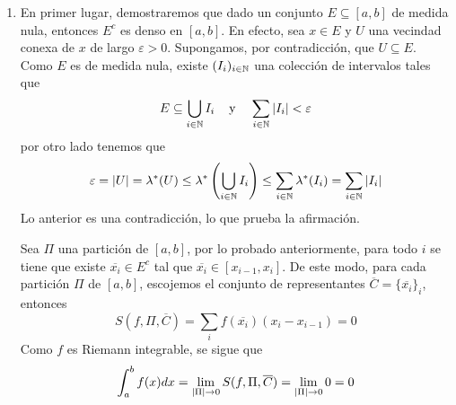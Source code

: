 \documentclass{article}
\begin{document}
\begin{enumerate}
    \item En primer lugar, demostraremos que dado un conjunto $E\subseteq[a,b]$ de medida nula, 
    entonces $E^{c}$ es denso en $[a,b]$. En efecto, sea $x\in E$ y $U$ una vecindad conexa de $x$ 
    de largo $\varepsilon>0$. Supongamos, por contradicción, que $U\subseteq E$. 
    Como $E$ es de medida nula, existe $(I_{i})_{i\in\mathbb{N}}$ una colección de intervalos tales que
    \begin{equation*}
        E\subseteq\bigcup_{i\in\mathbb{N}}I_{i}\hspace{4mm}\text{y}\hspace{4mm}
        \sum_{i\in\mathbb{N}}\left|I_{i} \right|<\varepsilon
    \end{equation*}
    por otro lado tenemos que
    \begin{equation*}
        \varepsilon=\left|U \right|=\lambda^{*}(U)\leq\lambda^{*}\left(\bigcup_{i\in\mathbb{N}}I_{i}\right)\leq
        \sum_{i\in\mathbb{N}}\lambda^{*}(I_{i})=\sum_{i\in\mathbb{N}}\left|I_{i} \right|
    \end{equation*}
    Lo anterior es una contradicción, lo que prueba la afirmación.
    \vspace{4mm}

    \noindent Sea $\Pi$ una partición de $[a,b]$, por lo probado anteriormente, para todo $i$ se
    tiene que existe $\overline{x_{i}}\in E^{c}$ tal que $\overline{x_{i}}\in[x_{i-1},x_{i}]$. De
    este modo, para cada partición $\Pi$ de $[a,b]$, escojemos el conjunto de representantes 
    $\overline{C}=\{\overline{x_{i}}\}_{i}$, entonces
    \begin{equation*}
        S(f,\Pi,\overline{C})=\sum_{i}f(\overline{x_{i}})(x_{i}-x_{i-1})=0
    \end{equation*}
    Como $f$ es Riemann integrable, se sigue que
    \begin{equation*}
        \int_{a}^{b}f(x)dx=\lim_{\left|\Pi \right|\to0}S(f,\Pi,\overline{C})=\lim_{\left|\Pi \right|\to0}0=0
    \end{equation*}
\end{enumerate}
\end{document}
